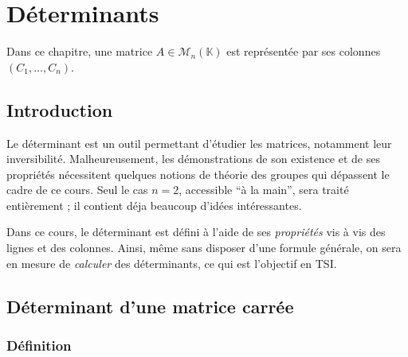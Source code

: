\documentclass[
  french,
  letterpaper,
  DIV=11,
  numbers=noendperiod]{scrreprt}
\theoremstyle{plain}
\theoremstyle{definition}
\theoremstyle{plain}
\theoremstyle{plain}
\theoremstyle{definition}
\theoremstyle{definition}
\theoremstyle{plain}
\theoremstyle{remark}
\begin{document}
\chapter{Déterminants}\label{duxe9terminants}

Dans ce chapitre, une matrice \(A \in \mathcal{M}_{n}(\mathbb{K})\) est
représentée par ses colonnes \((C_{1},\dots,C_{n})\).

\section*{Introduction}\label{introduction-3}


Le déterminant est un outil permettant d'étudier les matrices, notamment
leur inversibilité. Malheureusement, les démonstrations de son existence
et de ses propriétés nécessitent quelques notions de théorie des groupes
qui dépassent le cadre de ce cours. Seul le cas \(n=2\), accessible ``à
la main'', sera traité entièrement ; il contient déja beaucoup d'idées
intéressantes.

Dans ce cours, le déterminant est défini à l'aide de ses
\emph{propriétés} vis à vis des lignes et des colonnes. Ainsi, même sans
disposer d'une formule générale, on sera en mesure de \emph{calculer}
des déterminants, ce qui est l'objectif en TSI.

\section{Déterminant d'une matrice carrée}\label{sec-04-determinant}

\subsection{Définition}\label{duxe9finition}
\end{document}
